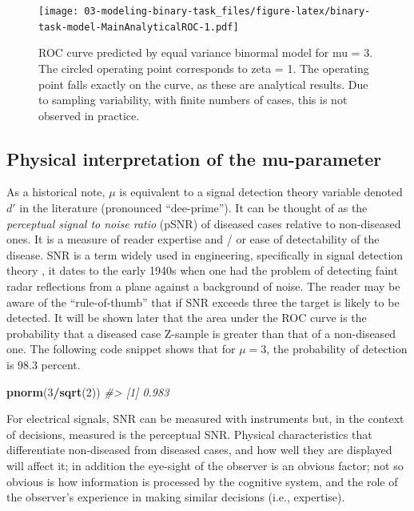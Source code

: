 \documentclass[
]{book}
\newenvironment{Shaded}{\begin{snugshade}}{\end{snugshade}}
\newcommand{\CommentTok}[1]{\textcolor[rgb]{0.56,0.35,0.01}{\textit{#1}}}
\newcommand{\DecValTok}[1]{\textcolor[rgb]{0.00,0.00,0.81}{#1}}
\newcommand{\KeywordTok}[1]{\textcolor[rgb]{0.13,0.29,0.53}{\textbf{#1}}}
\newcommand{\NormalTok}[1]{#1}
\newcommand{\OperatorTok}[1]{\textcolor[rgb]{0.81,0.36,0.00}{\textbf{#1}}}
\begin{document}
\begin{figure}
\centering
\texttt{[image: 03-modeling-binary-task\_files/figure-latex/binary-task-model-MainAnalyticalROC-1.pdf]}
\caption{\label{fig:binary-task-model-MainAnalyticalROC}ROC curve predicted by equal variance binormal model for mu = 3. The circled operating point corresponds to zeta = 1. The operating point falls exactly on the curve, as these are analytical results. Due to sampling variability, with finite numbers of cases, this is not observed in practice.}
\end{figure}

\hypertarget{binary-task-model-mu-parameter-intepretation}{%
\subsection{Physical interpretation of the mu-parameter}\label{binary-task-model-mu-parameter-intepretation}}

As a historical note, \(\mu\) is equivalent \citep{macmillan2004detection} to a signal detection theory variable denoted \(d'\) in the literature (pronounced ``dee-prime''). It can be thought of as the \emph{perceptual signal to noise ratio} (pSNR) of diseased cases relative to non-diseased ones. It is a measure of reader expertise and / or ease of detectability of the disease. SNR is a term widely used in engineering, specifically in signal detection theory \citep{green1966signal, egan1975book}, it dates to the early 1940s when one had the problem \citep[\citet{marcum1960statistical}]{marcum1947statistical} of detecting faint radar reflections from a plane against a background of noise. The reader may be aware of the ``rule-of-thumb'' that if SNR exceeds three the target is likely to be detected. It will be shown later that the area under the ROC curve is the probability that a diseased case Z-sample is greater than that of a non-diseased one. The following code snippet shows that for \(\mu = 3\), the probability of detection is 98.3 percent.

\begin{Shaded}
\begin{Highlighting}[]
\KeywordTok{pnorm}\NormalTok{(}\DecValTok{3}\OperatorTok{/}\KeywordTok{sqrt}\NormalTok{(}\DecValTok{2}\NormalTok{))}
\CommentTok{#> [1] 0.983}
\end{Highlighting}
\end{Shaded}

For electrical signals, SNR can be measured with instruments but, in the context of decisions, measured is the perceptual SNR. Physical characteristics that differentiate non-diseased from diseased cases, and how well they are displayed will affect it; in addition the eye-sight of the observer is an obvious factor; not so obvious is how information is processed by the cognitive system, and the role of the observer's experience in making similar decisions (i.e., expertise).
\end{document}

